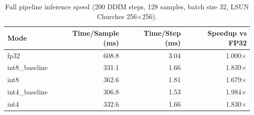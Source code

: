 \begin{table}[htbp]
\centering
\small
\caption{Full pipeline inference speed (200 DDIM steps, 128 samples, batch size 32, LSUN Churches 256$\times$256).}
\label{tab:pipeline_speedup}
\begin{tabular}{lrrr}
\toprule
Mode & Time/Sample (ms) & Time/Step (ms) & Speedup vs FP32 \\
\midrule
fp32 & 608.8 & 3.04 & 1.000$\times$ \\
int8\_baseline & 331.1 & 1.66 & 1.839$\times$ \\
int8 & 362.6 & 1.81 & 1.679$\times$ \\
int4\_baseline & 306.8 & 1.53 & 1.984$\times$ \\
int4 & 332.6 & 1.66 & 1.830$\times$ \\
\bottomrule
\end{tabular}
\end{table}
